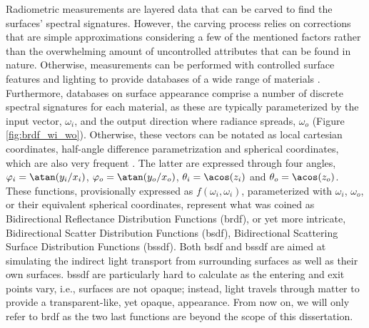 Radiometric measurements are layered data that can be carved to find the surfaces' spectral signatures. However, the carving process relies on corrections that are simple approximations considering a few of the mentioned factors rather than the overwhelming amount of uncontrolled attributes that can be found in nature. Otherwise, measurements can be performed with controlled surface features and lighting to provide databases of a wide range of materials \cite{dupuy_adaptive_2018}. Furthermore, databases on surface appearance comprise a number of discrete spectral signatures for each material, as these are typically parameterized by the input vector, $\omega_i$, and the output direction where radiance spreads, $\omega_o$ (Figure \ref{fig:brdf_wi_wo}). Otherwise, these vectors can be notated as local cartesian coordinates, half-angle difference parametrization and spherical coordinates, which are also very frequent \cite{montes_soldado_overview_2012}. The latter are expressed through four angles, $\varphi_i = \atan(y_i / x_i)$, $\varphi_o = \atan(y_o / x_o)$, $\theta_i = \acos(z_i)$ and $\theta_o = \acos(z_o)$. These functions, provisionally expressed as $f(\omega_i, \omega_i)$, parameterized with $\omega_i$, $\omega_o$, or their equivalent spherical coordinates, represent what was coined as Bidirectional Reflectance Distribution Functions (\acrshort{brdf}), or yet more intricate, Bidirectional Scatter Distribution Functions (\acrshort{bsdf}), Bidirectional Scattering Surface Distribution Functions (\acrshort{bssdf}). Both \acrshort{bsdf} and \acrshort{bssdf} are aimed at simulating the indirect light transport from surrounding surfaces as well as their own surfaces. \acrshort{bssdf} are particularly hard to calculate as the entering and exit points vary, i.e., surfaces are not opaque; instead, light travels through matter to provide a transparent-like, yet opaque, appearance. From now on, we will only refer to \acrshort{brdf} as the two last functions are beyond the scope of this dissertation.
